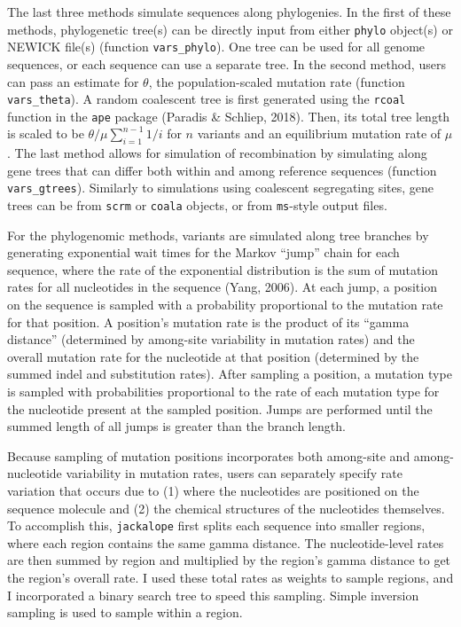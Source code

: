 \documentclass[12pt,]{article}
\begin{document}
The last three methods simulate sequences along phylogenies.
In the first of these methods,
phylogenetic tree(s) can be directly input from either \texttt{phylo} object(s) or
NEWICK file(s) (function \texttt{vars\_phylo}).
One tree can be used for all genome sequences, or each sequence can use a separate tree.
In the second method, users can pass an estimate for \(\theta\), the population-scaled
mutation rate (function \texttt{vars\_theta}).
A random coalescent tree is first generated using the \texttt{rcoal} function
in the \texttt{ape} package (Paradis \& Schliep, 2018).
Then, its total tree length is scaled to be
\(\theta / \mu \sum_{i=1}^{n-1}{1 / i}\) for \(n\) variants and an equilibrium
mutation rate of \(\mu\).
The last method allows for simulation of recombination by simulating along
gene trees that can differ both within and among reference sequences
(function \texttt{vars\_gtrees}).
Similarly to simulations using coalescent segregating sites, gene trees can be
from \texttt{scrm} or \texttt{coala} objects, or from \texttt{ms}-style output files.

For the phylogenomic methods, variants are simulated along tree branches by
generating exponential wait times
for the Markov ``jump'' chain for each sequence,
where the rate of the exponential distribution is the sum of mutation rates for
all nucleotides in the sequence (Yang, 2006).
At each jump, a position on the sequence is sampled with a probability proportional to
the mutation rate for that position.
A position's mutation rate is the product of its ``gamma distance''
(determined by among-site variability in mutation rates) and the overall mutation rate
for the nucleotide at that position
(determined by the summed indel and substitution rates).
After sampling a position, a mutation type is sampled with probabilities
proportional to the rate of each mutation type for the nucleotide
present at the sampled position.
Jumps are performed until the summed length of all jumps is greater than the
branch length.

Because sampling of mutation positions incorporates both among-site and among-nucleotide
variability in mutation rates,
users can separately specify rate variation that occurs due to
(1) where the nucleotides are positioned on the sequence molecule and
(2) the chemical structures of the nucleotides themselves.
To accomplish this, \texttt{jackalope} first splits each sequence into
smaller regions, where each region contains the same gamma distance.
The nucleotide-level rates are then summed by region and multiplied by the region's
gamma distance to get the region's overall rate.
I used these total rates as weights to sample regions, and
I incorporated a binary search tree to speed this sampling.
Simple inversion sampling is used to sample within a region.
\end{document}

